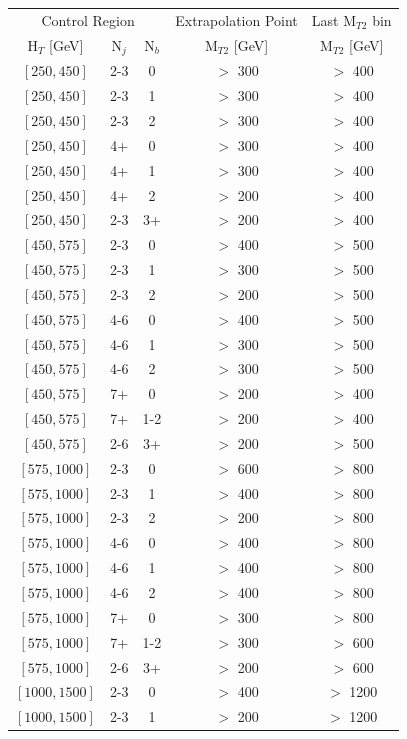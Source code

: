\begin{table}
	\centering
	\footnotesize
	\renewcommand{\arraystretch}{0.5}
	\begin{tabular}{c|c|c|c|c}
\hline \hline
\multicolumn{3}{c|}{Control Region} & Extrapolation Point & Last $\text{M}_{T2}$ bin  \\
$\text{H}_{T}$ [GeV] & $\text{N}_{j}$ & $\text{N}_{b}$ & $\text{M}_{T2}$ [GeV] & $\text{M}_{T2}$ [GeV]\\
\hline
$[250,450]$ &2-3&0& $>$ 300& $>$ 400\\
$[250,450]$ &2-3&1& $>$ 300& $>$ 400\\
$[250,450]$ &2-3&2& $>$ 300& $>$ 400\\
$[250,450]$ &4+&0& $>$ 300& $>$ 400\\
$[250,450]$ &4+&1& $>$ 300& $>$ 400\\
$[250,450]$ &4+&2& $>$ 200& $>$ 400\\
$[250,450]$ &2-3&3+& $>$ 200& $>$ 400\\
$[450,575]$ &2-3&0& $>$ 400& $>$ 500\\
$[450,575]$ &2-3&1& $>$ 300& $>$ 500\\
$[450,575]$ &2-3&2& $>$ 200& $>$ 500\\
$[450,575]$ &4-6&0& $>$ 400& $>$ 500\\
$[450,575]$ &4-6&1& $>$ 300& $>$ 500\\
$[450,575]$ &4-6&2& $>$ 300& $>$ 500\\
$[450,575]$ &7+&0& $>$ 200& $>$ 400\\
$[450,575]$ &7+&1-2& $>$ 200& $>$ 400\\
$[450,575]$ &2-6&3+& $>$ 200& $>$ 500\\
$[575,1000]$ &2-3&0& $>$ 600& $>$ 800\\
$[575,1000]$ &2-3&1& $>$ 400& $>$ 800\\
$[575,1000]$ &2-3&2& $>$ 200& $>$ 800\\
$[575,1000]$ &4-6&0& $>$ 400& $>$ 800\\
$[575,1000]$ &4-6&1& $>$ 400& $>$ 800\\
$[575,1000]$ &4-6&2& $>$ 400& $>$ 800\\
$[575,1000]$ &7+&0& $>$ 300& $>$ 800\\
$[575,1000]$ &7+&1-2& $>$ 300& $>$ 600\\
$[575,1000]$ &2-6&3+& $>$ 200& $>$ 600\\
$[1000,1500]$ &2-3&0& $>$ 400& $>$ 1200\\
$[1000,1500]$ &2-3&1& $>$ 200& $>$ 1200\\

\end{tabular}
\end{table}
